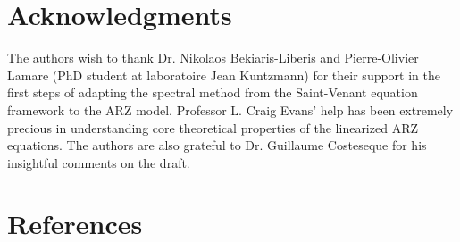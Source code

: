 \documentclass[5p,twocolumn]{elsarticle}
\begin{document}
%

\section*{Acknowledgments}
The authors wish to thank Dr. Nikolaos Bekiaris-Liberis and Pierre-Olivier Lamare (PhD student at laboratoire Jean Kuntzmann) for their support in the first steps of adapting the spectral method from the Saint-Venant equation framework to the ARZ model. Professor L. Craig Evans' help has been extremely precious in understanding core theoretical properties of the linearized ARZ equations. The authors are also grateful to Dr. Guillaume Costeseque for his insightful comments on the draft.


\section*{References}


\end{document}
